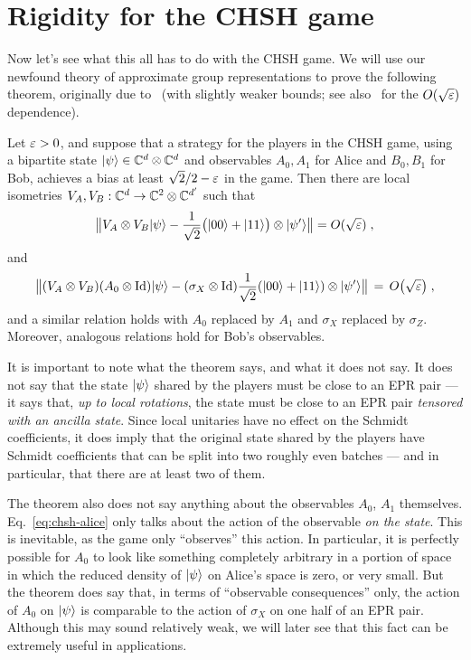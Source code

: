 \section{Rigidity for the CHSH game}

Now let's see what this all has to do with the CHSH game. We will use our newfound theory of approximate group representations to prove the following theorem, originally due to~\cite{summers1988maximal} (with slightly weaker bounds; see also~\cite{mckague2012robust} for the $O(\sqrt{\varepsilon})$ dependence).

\begin{theorem}\label{thm:rigid-chsh}
Let $\varepsilon>0$, and suppose that a strategy for the players  in the CHSH game, using  a bipartite state $|\psi\rangle\in\mathbb{C}^d\otimes \mathbb{C}^d$ and observables $A_0,A_1$ for Alice and $B_0,B_1$ for Bob, achieves a bias at least $\sqrt{2}/2-\varepsilon$ in the game. Then there are local isometries $V_A,V_B:\mathbb{C}^d \to \mathbb{C}^2 \otimes \mathbb{C}^{d'}$ such that 
\begin{equation}\label{eq:chsh-state}
\big\| V_A \otimes V_B |\psi\rangle - \frac{1}{\sqrt{2}}\big(|00\rangle+|11\rangle\big) \otimes |\psi'\rangle \big\| = O(\sqrt{\varepsilon}) \;,
\end{equation}
and 
\begin{equation}\label{eq:chsh-alice}
\big\|( V_A \otimes V_B)( A_0 \otimes \mathop{\rm Id}\nolimits )|\psi\rangle - (\sigma_X \otimes \mathop{\rm Id}\nolimits)\frac{1}{\sqrt{2}}(|00\rangle+|11\rangle) \otimes |\psi'\rangle \big\|\,=\, O\big(\sqrt{\varepsilon}\big)\;,
\end{equation}
and a similar relation holds with $A_0$ replaced by $A_1$ and $\sigma_X$ replaced by $\sigma_Z$. Moreover, analogous relations hold for Bob's observables. 
\end{theorem}

It is important to note what the theorem says, and what it does not say. It does not say that the state $|\psi\rangle$ shared by the players must be close to an EPR pair --- it says that, \emph{up to local rotations}, the state must be close to an EPR pair \emph{tensored with an ancilla state}. Since local unitaries have no effect on the Schmidt coefficients, it does imply that the original state shared by the players have Schmidt coefficients that can be split into two roughly even batches --- and in particular, that there are at least two of them. 

 The theorem also does not say anything about the observables $A_0$, $A_1$ themselves. Eq.~\eqref{eq:chsh-alice} only talks about the action of the observable \emph{on the state}. This is inevitable, as the game only ``observes'' this action. In particular, it is perfectly possible for $A_0$ to look like something completely arbitrary in a portion of space in which the reduced density of $|\psi\rangle$ on Alice's space is zero, or very small. But the theorem does say that, in terms of ``observable consequences'' only, the action of $A_0$ on $|\psi\rangle$ is comparable to the action of $\sigma_X$ on one half of an EPR pair. Although this may sound relatively weak, we will later see that this fact can be extremely useful in applications. 


